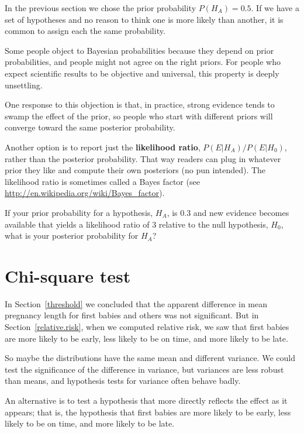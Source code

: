 \documentclass[12pt]{book}
\begin{document}
In the previous section we chose the prior probability $P(H_A) = 0.5$.
If we have a set of hypotheses and no reason to think one is more
likely than another, it is common to assign each the same probability.



Some people object to Bayesian probabilities because they depend on
prior probabilities, and people might not agree on
the right priors.  For people who expect scientific results to be
objective and universal, this property is deeply unsettling.

One response to this objection is that, in practice, strong evidence
tends to swamp the effect of the prior, so people who start with
different priors will converge toward the same posterior
probability.

Another option is to report just the {\bf likelihood ratio}, 
$P(E | H_A)/P(E | H_0)$, rather than the posterior probability.  That way
readers can plug in whatever prior they like and compute their own
posteriors (no pun intended).  The likelihood ratio is sometimes
called a Bayes factor (see \url{http://en.wikipedia.org/wiki/Bayes_factor}).

\begin{ex}

If your prior probability for a hypothesis, $H_A$, is 0.3 and new
evidence becomes available that yields a likelihood ratio of 3
relative to the null hypothesis, $H_0$, what is your posterior
probability for $H_A$?


\end{ex}


\section{Chi-square test}

In Section~\ref{threshold} we concluded that the apparent difference
in mean pregnancy length for first babies and others was not
significant.  But in Section~\ref{relative.risk}, when we computed
relative risk, we saw that first babies are more likely to be early,
less likely to be on time, and more likely to be late.

So maybe the distributions have the same mean and different variance.
We could test the significance of the difference in variance, but
variances are less robust than means, and hypothesis tests for
variance often behave badly.

An alternative is to test a hypothesis that more directly reflects the
effect as it appears; that is, the hypothesis that first babies are
more likely to be early, less likely to be on time, and more likely to
be late.
\end{document}
